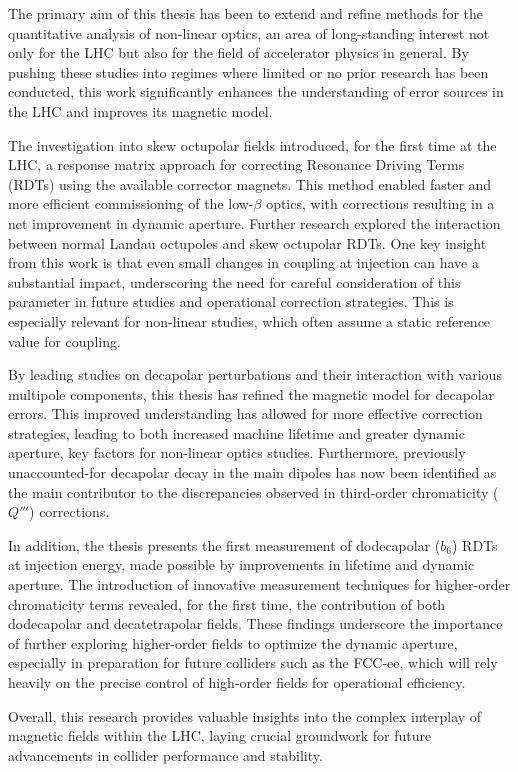 \label{chapter:conclusions}

The primary aim of this thesis has been to extend and refine methods for the quantitative analysis
of non-linear optics, an area of long-standing interest not only for the LHC but also for the field
of accelerator physics in general. By pushing these studies into regimes where limited or no prior
research has been conducted, this work significantly enhances the understanding of error sources in
the LHC and improves its magnetic model.

The investigation into skew octupolar fields introduced, for the first time at the LHC, a response
matrix approach for correcting Resonance Driving Terms (RDTs) using the available corrector magnets.
This method enabled faster and more efficient commissioning of the low-$\beta$ optics, with
corrections resulting in a net improvement in dynamic aperture. Further research explored the
interaction between normal Landau octupoles and skew octupolar RDTs. One key insight from this work
is that even small changes in coupling at injection can have a substantial impact, underscoring the
need for careful consideration of this parameter in future studies and operational correction
strategies. This is especially relevant for non-linear studies, which often assume a static
reference value for coupling.

By leading studies on decapolar perturbations and their interaction with various multipole
components, this thesis has refined the magnetic model for decapolar errors. This improved
understanding has allowed for more effective correction strategies, leading to both increased
machine lifetime and greater dynamic aperture, key factors for non-linear optics studies.
Furthermore, previously unaccounted-for decapolar decay in the main dipoles has now been identified
as the main contributor to the discrepancies observed in third-order chromaticity ($Q'''$)
corrections.

In addition, the thesis presents the first measurement of dodecapolar ($b_6$) RDTs at injection
energy, made possible by improvements in lifetime and dynamic aperture. The introduction of
innovative measurement techniques for higher-order chromaticity terms revealed, for the first time,
the contribution of both dodecapolar and decatetrapolar fields. These findings underscore the
importance of further exploring higher-order fields to optimize the dynamic aperture, especially in
preparation for future colliders such as the FCC-ee, which will rely heavily on the precise control
of high-order fields for operational efficiency.

Overall, this research provides valuable insights into the complex interplay of magnetic fields
within the LHC, laying crucial groundwork for future advancements in collider performance and
stability.
